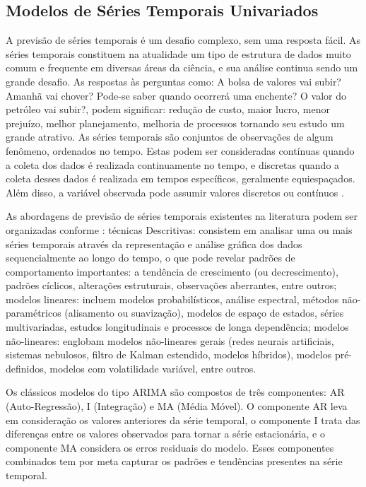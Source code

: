 \subsection{Modelos de S\'eries Temporais Univariados}\label{subsec:arima}

A previsão de séries temporais é um desafio complexo, sem uma resposta fácil. 
As séries temporais constituem na atualidade um tipo de estrutura de dados muito comum e frequente em diversas áreas da ciência, e sua análise continua sendo um grande desafio.
As respostas às perguntas como: A bolsa de valores vai subir? Amanhã vai chover? Pode-se saber quando ocorrerá uma enchente? O valor do petróleo vai subir?, podem significar: redução de custo, maior lucro, menor prejuízo, melhor planejamento, melhoria de processos tornando seu estudo um grande atrativo.
As séries temporais são conjuntos de observações de algum fenômeno, ordenados no tempo. Estas podem ser consideradas contínuas quando a coleta dos dados é realizada continuamente no tempo, e discretas quando a coleta desses dados é realizada em tempos específicos, geralmente equiespaçados. Além disso, a variável observada pode assumir valores discretos ou contínuos \cite{Martinho2023}.

As abordagens de previsão de séries temporais existentes na literatura podem ser organizadas conforme \cite{Martinho2023}:
técnicas Descritivas: consistem em analisar uma ou mais séries temporais através da representação e análise gráfica dos dados sequencialmente ao longo do tempo, o que pode revelar padrões de comportamento importantes: a tendência de crescimento (ou decrescimento), padrões cíclicos, alterações estruturais, observações aberrantes, entre outros;
modelos lineares: incluem modelos probabilísticos, análise espectral, métodos não- paramétricos (alisamento ou suavização), modelos de espaço de estados, séries multivariadas, estudos longitudinais e processos de longa dependência;
modelos não-lineares: englobam modelos não-lineares gerais (redes neurais artificiais, sistemas nebulosos, filtro de Kalman estendido, modelos híbridos), modelos pré-definidos, modelos com volatilidade variável, entre outros.

Os clássicos modelos do tipo ARIMA são compostos de três componentes: AR (Auto-Regressão), I (Integração) e MA (Média Móvel). O componente AR leva em consideração os valores anteriores da série temporal, o componente I trata das diferenças entre os valores observados para tornar a série estacionária, e o componente MA considera os erros residuais do modelo. Esses componentes combinados  tem por meta capturar os padrões e tendências presentes na série temporal.

